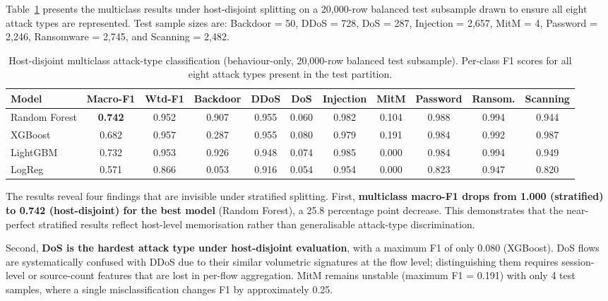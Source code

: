\documentclass[12pt,a4paper]{report}
\begin{document}
Table~\ref{tab:host-multiclass} presents the multiclass results under host-disjoint splitting on a 20,000-row balanced test subsample drawn to ensure all eight attack types are represented. Test sample sizes are: Backdoor = 50, DDoS = 728, DoS = 287, Injection = 2,657, MitM = 4, Password = 2,246, Ransomware = 2,745, and Scanning = 2,482.

\begin{table}[H]
\centering
\caption{Host-disjoint multiclass attack-type classification (behaviour-only, 20,000-row balanced test subsample). Per-class F1 scores for all eight attack types present in the test partition.}
\label{tab:host-multiclass}
\small
\begin{tabular}{lcccccccccc}
\toprule
\textbf{Model} & \textbf{Macro-F1} & \textbf{Wtd-F1} & \textbf{Backdoor} & \textbf{DDoS} & \textbf{DoS} & \textbf{Injection} & \textbf{MitM} & \textbf{Password} & \textbf{Ransom.} & \textbf{Scanning} \\
\midrule
Random Forest & \textbf{0.742} & 0.952 & 0.907 & 0.955 & 0.060 & 0.982 & 0.104 & 0.988 & 0.994 & 0.944 \\
XGBoost & 0.682 & 0.957 & 0.287 & 0.955 & 0.080 & 0.979 & 0.191 & 0.984 & 0.992 & 0.987 \\
LightGBM & 0.732 & 0.953 & 0.926 & 0.948 & 0.074 & 0.985 & 0.000 & 0.984 & 0.994 & 0.949 \\
LogReg & 0.571 & 0.866 & 0.053 & 0.916 & 0.054 & 0.954 & 0.000 & 0.823 & 0.947 & 0.820 \\
\bottomrule
\end{tabular}
\end{table}

The results reveal four findings that are invisible under stratified splitting. First, \textbf{multiclass macro-F1 drops from 1.000 (stratified) to 0.742 (host-disjoint) for the best model} (Random Forest), a 25.8 percentage point decrease. This demonstrates that the near-perfect stratified results reflect host-level memorisation rather than generalisable attack-type discrimination.

Second, \textbf{DoS is the hardest attack type under host-disjoint evaluation}, with a maximum F1 of only 0.080 (XGBoost). DoS flows are systematically confused with DDoS due to their similar volumetric signatures at the flow level; distinguishing them requires session-level or source-count features that are lost in per-flow aggregation. MitM remains unstable (maximum F1 = 0.191) with only 4 test samples, where a single misclassification changes F1 by approximately 0.25.
\end{document}
